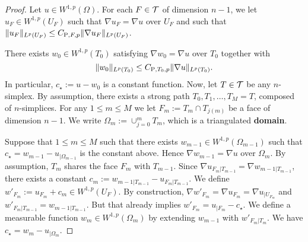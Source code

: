 \documentclass[a4paper]{article}
\begin{document}
\begin{proof}
 Let $u \in W^{1,p}(\Omega)$. 
 For each $F \in {\mathcal T}$ of dimension $n-1$, 
 we let $u_F \in W^{1,p}(U_F)$ such that $\nabla u_F = \nabla u$ over $U_F$ and such that $\| u_F \|_{L^{p}(U_F)} \leq C_{{\rm{P}},F,p} \| \nabla u_F \|_{L^{p}(U_F)}$.
 
 There exists $w_0 \in W^{1,p}(T_{0})$ satisfying $\nabla w_0 = \nabla u$ over $T_{0}$ together with 
 \[
    \| w_0 \|_{L^{p}(T_{0})} \leq C_{{\rm{P}},T_{0},p} \| \nabla u \|_{L^{p}(T_{0})}.
 \]
 In particular, $c_{\star} := u - w_0$ is a constant function. 
 Now, let $T \in {\mathcal T}$ be any $n$-simplex. 
 By assumption, there exists a strong path $T_0, T_1, \dots, T_M = T$, composed of $n$-simplices. 
 For any $1 \leq m \leq M$ we let $F_m := T_m \cap T_{j(m)}$ be a face of dimension $n-1$. 
 We write $\Omega_m := \cup_{j=0}^{m} T_m$, which is a triangulated \textbf{domain}. %
 
 
 Suppose that $1 \leq m \leq M$ such that there exists $w_{m-1} \in W^{1,p}(\Omega_{m-1})$ 
 such that $c_{\star} = w_{m-1} - u_{|\Omega_{m-1}}$ is the constant above. 
 Hence $\nabla w_{m-1} = \nabla u$ over $\Omega_m$. 
 By assumption, $T_{m}$ shares the face $F_{m}$ with $T_{{m-1}}$. 
 Since $\nabla u_{F_{m}|T_{{m-1}}} = \nabla w_{m-1|T_{{m-1}}}$,
 there exists a constant $c_{m} := w_{m-1|T_{{m-1}}} - u_{F_{m}|T_{{m-1}}}$.
 We define $w'_{F_m} := u_{F_m} + c_{m} \in W^{1,p}(U_F)$.
 By construction, $\nabla w'_{F_m} = \nabla u_{F_m} = \nabla u_{|U_{F_m}}$ 
 and 
 $w'_{F_{m}|T_{{m-1}}} = w_{m-1|T_{{m-1}}}$. 
 But that already implies $w'_{F_m} = u_{|F_m} - c_{\star}$. 
 We define a measurable function $w_{m} \in W^{1,p}(\Omega_m)$ by extending $w_{m-1}$ with $w'_{F_m|T_m}$.
 We have $c_{\star} = w_{m} - u_{|\Omega_{m}}$. 
 

\end{proof}
\end{document}

